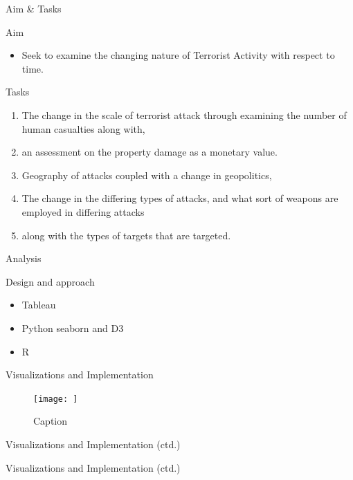 \documentclass[10pt]{beamer}
\begin{document}
\begin{frame}{Aim \& Tasks}

\begin{alertblock}{Aim}
        \begin{itemize}
            \item Seek to examine the changing nature of Terrorist Activity with respect to time.
        \end{itemize}
    \end{alertblock}

\begin{block}{Tasks}
    \begin{enumerate}
	\item The change in the scale of terrorist attack through examining the number of human casualties along with,
    \item an assessment on the property damage as a monetary value. 
    \item Geography of attacks coupled with a change in geopolitics, 
    \item The change in the differing types of attacks, and what sort of weapons are employed in differing attacks 
    \item along with the types of targets that are targeted.
\end{enumerate}
\end{block}

\end{frame}




\begin{frame}{Analysis}
   \begin{block}{Design and approach}
       \begin{itemize}
           \item Tableau
           \item Python seaborn and D3
           \item R
       \end{itemize}
   \end{block} 
\end{frame}


\begin{frame}{Visualizations and Implementation}
    \begin{figure}
        \centering
        \texttt{[image: ]}
        \caption{Caption}
        \label{fig:my_label}
    \end{figure}
\end{frame}
\begin{frame}{Visualizations and Implementation (ctd.) }
    
\end{frame}
\begin{frame}{Visualizations and Implementation (ctd.) }
    
\end{frame}
\end{document}
